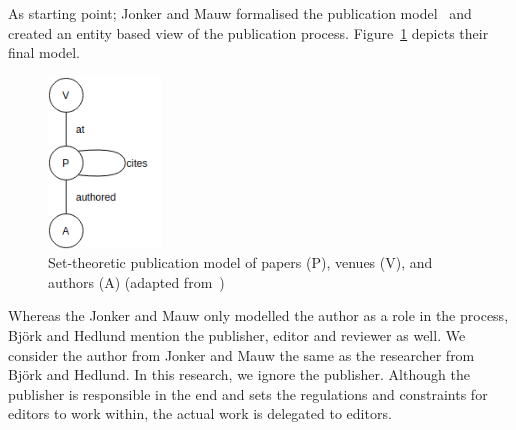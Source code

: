 \documentclass{ou-report}
\newcommand{\todo}[1]{{\color{red} TODO: #1}}
\begin{document}
As starting point; Jonker and Mauw formalised the publication model~\cite{JM2017} 
and created an entity based view of the publication process. 
Figure~\ref{fig:jm2017_induced_pub_model} depicts their final model.
\begin{figure}[H]
\centering
\includegraphics[width=3cm]{images/jm2017_undiced_pub_view.drawio.png}
\caption{Set-theoretic publication model of papers (P), venues (V), and 
authors (A) (adapted from~\cite{JM2017})}
\label{fig:jm2017_induced_pub_model}
\end{figure}


Whereas the Jonker and Mauw only modelled the author as a role in the process, 
Bj\"ork and Hedlund mention the publisher, editor and reviewer as well. 
We consider the author from Jonker and Mauw the same as the researcher from 
Bj\"ork and Hedlund. In this research, we ignore the publisher. Although the 
publisher is responsible in the end and sets the regulations and constraints for 
editors to work within, the actual work is delegated to editors.



\end{document}
